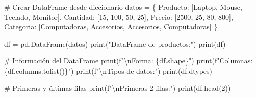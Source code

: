 \documentclass[
  doc,
  floatsintext,
  longtable,
  a4paper,
  nolmodern,
  notxfonts,
  notimes,
  12pt,
  colorlinks=true,linkcolor=blue,citecolor=blue,urlcolor=blue]{apa7}
\newenvironment{Shaded}{\begin{snugshade}}{\end{snugshade}}
\newcommand{\BuiltInTok}[1]{\textcolor[rgb]{0.00,0.23,0.31}{#1}}
\newcommand{\CharTok}[1]{\textcolor[rgb]{0.13,0.47,0.30}{#1}}
\newcommand{\CommentTok}[1]{\textcolor[rgb]{0.37,0.37,0.37}{#1}}
\newcommand{\DecValTok}[1]{\textcolor[rgb]{0.68,0.00,0.00}{#1}}
\newcommand{\NormalTok}[1]{\textcolor[rgb]{0.00,0.23,0.31}{#1}}
\newcommand{\OperatorTok}[1]{\textcolor[rgb]{0.37,0.37,0.37}{#1}}
\newcommand{\SpecialCharTok}[1]{\textcolor[rgb]{0.37,0.37,0.37}{#1}}
\newcommand{\SpecialStringTok}[1]{\textcolor[rgb]{0.13,0.47,0.30}{#1}}
\newcommand{\StringTok}[1]{\textcolor[rgb]{0.13,0.47,0.30}{#1}}
\begin{document}
\begin{Shaded}
\begin{Highlighting}[]
\CommentTok{\# Crear DataFrame desde diccionario}
\NormalTok{datos }\OperatorTok{=}\NormalTok{ \{}
    \StringTok{\textquotesingle{}Producto\textquotesingle{}}\NormalTok{: [}\StringTok{\textquotesingle{}Laptop\textquotesingle{}}\NormalTok{, }\StringTok{\textquotesingle{}Mouse\textquotesingle{}}\NormalTok{, }\StringTok{\textquotesingle{}Teclado\textquotesingle{}}\NormalTok{, }\StringTok{\textquotesingle{}Monitor\textquotesingle{}}\NormalTok{],}
    \StringTok{\textquotesingle{}Cantidad\textquotesingle{}}\NormalTok{: [}\DecValTok{15}\NormalTok{, }\DecValTok{100}\NormalTok{, }\DecValTok{50}\NormalTok{, }\DecValTok{25}\NormalTok{],}
    \StringTok{\textquotesingle{}Precio\textquotesingle{}}\NormalTok{: [}\DecValTok{2500}\NormalTok{, }\DecValTok{25}\NormalTok{, }\DecValTok{80}\NormalTok{, }\DecValTok{800}\NormalTok{],}
    \StringTok{\textquotesingle{}Categoria\textquotesingle{}}\NormalTok{: [}\StringTok{\textquotesingle{}Computadoras\textquotesingle{}}\NormalTok{, }\StringTok{\textquotesingle{}Accesorios\textquotesingle{}}\NormalTok{, }\StringTok{\textquotesingle{}Accesorios\textquotesingle{}}\NormalTok{, }\StringTok{\textquotesingle{}Computadoras\textquotesingle{}}\NormalTok{]}
\NormalTok{\}}

\NormalTok{df }\OperatorTok{=}\NormalTok{ pd.DataFrame(datos)}
\BuiltInTok{print}\NormalTok{(}\StringTok{"DataFrame de productos:"}\NormalTok{)}
\BuiltInTok{print}\NormalTok{(df)}

\CommentTok{\# Información del DataFrame}
\BuiltInTok{print}\NormalTok{(}\SpecialStringTok{f"}\CharTok{\textbackslash{}n}\SpecialStringTok{Forma: }\SpecialCharTok{\{}\NormalTok{df}\SpecialCharTok{.}\NormalTok{shape}\SpecialCharTok{\}}\SpecialStringTok{"}\NormalTok{)}
\BuiltInTok{print}\NormalTok{(}\SpecialStringTok{f"Columnas: }\SpecialCharTok{\{}\NormalTok{df}\SpecialCharTok{.}\NormalTok{columns}\SpecialCharTok{.}\NormalTok{tolist()}\SpecialCharTok{\}}\SpecialStringTok{"}\NormalTok{)}
\BuiltInTok{print}\NormalTok{(}\SpecialStringTok{f"}\CharTok{\textbackslash{}n}\SpecialStringTok{Tipos de datos:"}\NormalTok{)}
\BuiltInTok{print}\NormalTok{(df.dtypes)}

\CommentTok{\# Primeras y últimas filas}
\BuiltInTok{print}\NormalTok{(}\SpecialStringTok{f"}\CharTok{\textbackslash{}n}\SpecialStringTok{Primeras 2 filas:"}\NormalTok{)}
\BuiltInTok{print}\NormalTok{(df.head(}\DecValTok{2}\NormalTok{))}
\end{Highlighting}
\end{Shaded}
\end{document}
